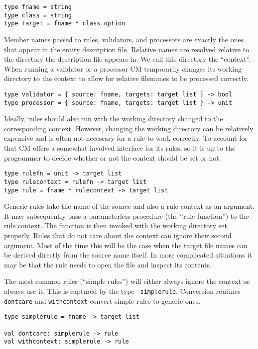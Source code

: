 \documentclass{article}
\begin{document}
\begin{verbatim}
type fname = string
type class = string
type target = fname * class option
\end{verbatim}

Member names passed to rules, validators, and processors are exactly
the ones that appear in the entity description file.  Relative names
are resolved relative to the directory the description file appears
in. We call this directory the ``context''.  When running a validator
or a processor CM temporarily changes its working directory to the
context to allow for relative filenames to be processed correctly.

\begin{verbatim}
type validator = { source: fname, targets: target list } -> bool
type processor = { source: fname, targets: target list } -> unit
\end{verbatim}

Ideally, rules should also run with the working directory changed to
the corresponding context.  However,  changing the working directory
can be relatively expensive and is often not necessary for a rule to
work correctly.  To account for that CM offers a somewhat involved
interface for its rules, so it is up to the programmer to decide
whether or not the context should be set or not.

\begin{verbatim}
type rulefn = unit -> target list
type rulecontext = rulefn -> target list
type rule = fname * rulecontext -> target list
\end{verbatim}

Generic rules take the name of the source and also a rule context as
an argument.  It may subsequently pass a parameterless procedure (the
``rule function'') to the rule context.  The function is then invoked
with the working directory set properly.  Rules that do not care about
the context can ignore their second argument.  Most of the time this
will be the case when the target file names can be derived directly
from the source name itself.  In more complicated situations it may be
that the rule needs to open the file and inspect its contents.

The most common rules (``simple rules'') will either always ignore the
context or always use it.  This is captured by the type {\tt
simplerule}.  Conversion routines {\tt dontcare} and {\tt withcontext}
convert simple rules to generic ones.
\begin{verbatim}
type simplerule = fname -> target list

val dontcare: simplerule -> rule
val withcontext: simplerule -> rule
\end{verbatim}
\end{document}
